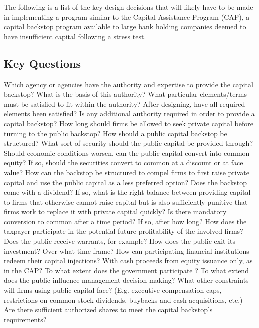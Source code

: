 \documentclass[12pt]{article}
\begin{document}
The following is a list of the key design decisions that will likely have to be made in implementing a program similar to the Capital Assistance Program (CAP), a  capital backstop program available to large bank holding companies deemed to have insufficient capital following a stress test.

\subsection{Key Questions}

\begin{outline}[enumerate]

\1 Which agency or agencies have the authority and expertise to provide the capital backstop?
\2 What is the basis of this authority?
\2 What particular elements/terms must be satisfied to fit within the authority?
\2 After designing, have all required elements been satisfied?
\2 Is any additional authority required in order to provide a capital backstop?
\2 How long should firms be allowed to seek private capital before turning to the public backstop?
\1 How should a public capital backstop be structured?
\2 What sort of security should the public capital be provided through?
\2 Should economic conditions worsen, can the public capital convert into common equity?
\3 If so, should the securities convert to common at a discount or at face value?
\2 How can the backstop be structured to compel firms to first raise private capital and use the public capital as a less preferred option?
\2 Does the backstop come with a dividend? If so, what is the right balance between providing capital to firms that otherwise cannot raise capital but is also sufficiently punitive that firms work to replace it with private capital quickly?
\2 Is there mandatory conversion to common after a time period? If so, after how long?
\2 How does the taxpayer participate in the potential future profitability of the involved firms? Does the public receive warrants, for example?
\2 How does the public exit its investment? Over what time frame? 
\2 How can participating financial institutions redeem their capital injections? With cash proceeds from equity issuance only, as in the CAP? 
\1 To what extent does the government participate ?
\2 To what extend does the public influence management decision making?
\2 What other constraints will firms using public capital face? (E.g. executive compensation caps, restrictions on common stock dividends, buybacks and cash acquisitions, etc.)
\2 Are there sufficient authorized shares to meet the capital backstop's requirements?

\end{outline}
\end{document}
